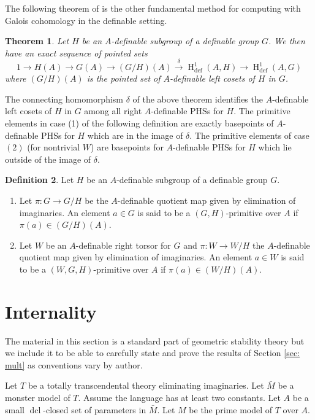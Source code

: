 \documentclass{amsart}
\newtheorem{theorem}{Theorem}[section]
\theoremstyle{definition}
\newtheorem{definition}[theorem]{Definition}
\theoremstyle{remark}
\numberwithin{equation}{section}
\def \defin {\operatorname{def}}
\def \HH {\operatorname{H}}
\def \dcl {\operatorname{dcl}}
\begin{document}
The following theorem of \cite{OmarAnandDavid} is the other fundamental method for computing with Galois cohomology in the definable setting.

\begin{theorem}\label{thm: LES}\cite{OmarAnandDavid}
     Let $H$ be an $A$-definable subgroup of a definable group $G$. We then have an exact sequence of pointed sets $$1 \to H(A) \to G(A) \to (G/H)(A) \xrightarrow{\delta} \HH^1_{\defin}(A,H)\to \HH^1_{\defin}(A,G)$$ where $(G/H)(A)$ is the pointed set of $A$-definable left cosets of $H$ in $G$.
\end{theorem}

The connecting homomorphism $\delta$ of the above theorem identifies the $A$-definable left cosets of $H$ in $G$ among all right $A$-definable PHSs for $H$. The primitive elements in case (1) of the following definition are exactly basepoints of $A$-definable PHSs for $H$ which are in the image of $\delta$. The primitive elements of case $(2)$ (for nontrivial $W$) are basepoints for $A$-definable PHSs for $H$ which lie outside of the image of $\delta$.

\begin{definition}\label{def: prim elt}
     Let $H$ be an $A$-definable subgroup of a definable group $G$. 
     \begin{enumerate}
         \item \cite{pillaysokolovic} Let $\pi:G\to G/H$ be the $A$-definable quotient map given by elimination of imaginaries. An element $a \in G$ is said to be a $(G,H)$-primitive over $A$ if $\pi(a) \in (G/H)(A)$. 
         \item \cite{MeretzkyThesis} Let $W$ be an $A$-definable right torsor for $G$ and $\pi:W \to W/H$ the $A$-definable quotient map given by elimination of imaginaries. An element $a \in W$ is said to be a $(W,G,H)$-primitive over $A$ if $\pi(a) \in (W/H)(A)$.
     \end{enumerate}
\end{definition}


\section{Internality}\label{sec: internality}

The material in this section is a standard part of geometric stability theory but we include it to be able to carefully state and prove the results of Section \ref{sec: mult} as conventions vary by author.

Let $T$ be a totally transcendental theory eliminating imaginaries. Let $\bar{M}$ be a monster model of $T$. Assume the language has at least two constants. Let $A$ be a small $\dcl$-closed set of parameters in $\bar{M}$. Let $M$ be the prime model of $T$ over $A$.
\end{document}
